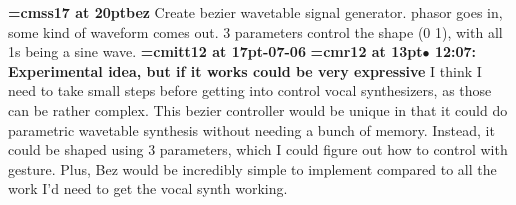{\medskip\noindent\bf\font\titlefont=cmss17 at 20pt\titlefont bez}\medskip
Create bezier wavetable signal generator. phasor goes in, some kind
of waveform comes out. 3 parameters control the shape (0 1), with all
1s being a sine wave.
{\medskip\noindent\bf\font\titlefont=cmitt12 at 17pt-07-06}\medskip
{\smallskip\noindent\bf\font\titlefont=cmr12 at 13pt\titlefont $\bullet$ 12:07: Experimental idea, but if it works could be very expressive}\smallskip
I think I need to take small steps before getting into control vocal synthesizers, as those can be rather complex. This bezier controller would be unique in that it could do parametric wavetable synthesis without needing a bunch of memory. Instead, it could be shaped using 3 parameters, which I could figure out how to control with gesture. Plus, Bez would be incredibly simple to implement compared to all the work I'd need to get the vocal synth working.
\par

\bye
